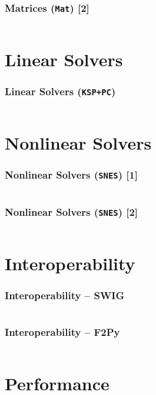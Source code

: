 \documentclass{beamer}
\begin{document}
\begin{frame}
  \frametitle{Matrices (\texttt{Mat}) [2]}
  \small\inputminted[linenos]{python}{petsc4py_mat_2.py}
\end{frame}


\section{Linear Solvers}

\begin{frame}
  \frametitle{Linear Solvers (\texttt{KSP+PC})}
  \small\inputminted[linenos]{python}{petsc4py_ksp.py}
\end{frame}


\section{Nonlinear Solvers}

\begin{frame}
  \frametitle{Nonlinear Solvers (\texttt{SNES}) [1]}
  \scriptsize\inputminted[linenos]{python}{petsc4py_snes_1.py}
\end{frame}

\begin{frame}
  \frametitle{Nonlinear Solvers (\texttt{SNES}) [2]}
  \small\inputminted[linenos]{python}{petsc4py_snes_2.py}
\end{frame}


\section{Interoperability}

\begin{frame}
  \frametitle{Interoperability -- \textbf{SWIG}}
  \small
  \inputminted[linenos]{c}{wrap_swig.i}
\end{frame}

\begin{frame}
  \frametitle{Interoperability -- \textbf{F2Py}}
  \scriptsize
  \inputminted[linenos]{fortran}{wrap_f2py.pyf}
\end{frame}


\section{Performance}
\end{document}

